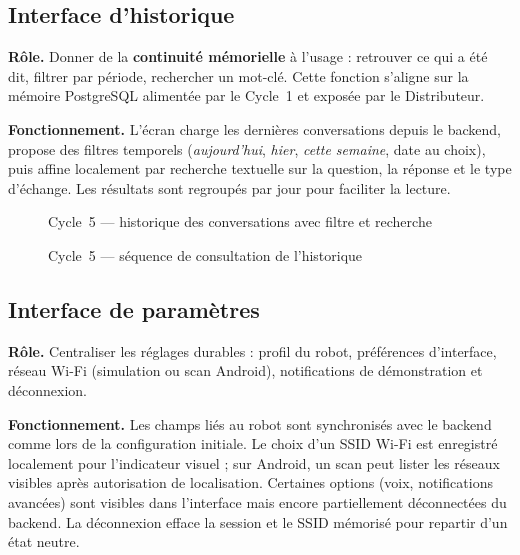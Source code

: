 \documentclass[a4paper,12pt]{report}
\begin{document}
	\subsection{Interface d'historique}
	
	\textbf{Rôle.} Donner de la \textbf{continuité mémorielle} à l'usage : retrouver
	ce qui a été dit, filtrer par période, rechercher un mot-clé. Cette fonction
	s'aligne sur la mémoire PostgreSQL alimentée par le Cycle~1 et exposée par le
	Distributeur.
	
	\textbf{Fonctionnement.} L'écran charge les dernières conversations depuis le
	backend, propose des filtres temporels (\textit{aujourd'hui}, \textit{hier},
	\textit{cette semaine}, date au choix), puis affine localement par recherche
	textuelle sur la question, la réponse et le type d'échange. Les résultats sont
	regroupés par jour pour faciliter la lecture.
	
	\begin{figure}[H]
		\centering
		\caption{Cycle~5 --- historique des conversations avec filtre et recherche}
		\label{fig:ch5-ecran-historique}
	\end{figure}
	
	\begin{figure}[H]
		\centering
		\caption{Cycle~5 --- séquence de consultation de l'historique}
		\label{fig:ch5-seq-historique}
	\end{figure}
	
	\subsection{Interface de paramètres}
	
	\textbf{Rôle.} Centraliser les réglages durables : profil du robot, préférences
	d'interface, réseau Wi-Fi (simulation ou scan Android), notifications de
	démonstration et déconnexion.
	
	\textbf{Fonctionnement.} Les champs liés au robot sont synchronisés avec le
	backend comme lors de la configuration initiale. Le choix d'un SSID Wi-Fi est
	enregistré localement pour l'indicateur visuel ; sur Android, un scan peut
	lister les réseaux visibles après autorisation de localisation. Certaines
	options (voix, notifications avancées) sont visibles dans l'interface mais
	encore partiellement déconnectées du backend. La déconnexion efface la session
	et le SSID mémorisé pour repartir d'un état neutre.
	
\end{document}
